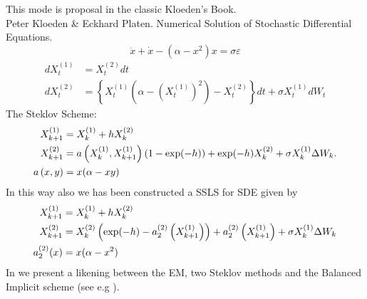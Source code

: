 This mode is proposal in the classic Kloeden's Book. \\ 
Peter Kloeden \& Eckhard Platen. Numerical Solution of Stochastic Differential Equations.
$$
	\ddot{x}+\dot{x}-(\alpha-x^2)x=\sigma \varepsilon
$$
\begin{align}
	dX_t^{(1)}&= X_t^{(2)} dt \label{eqn:SimDuffingVanDerPolSDE1}\\
	dX_t^{(2)}&=
		\left\{
		X_t^{(1)}
		\left(
			\alpha-(X_t^{(1)})^2
		\right)
		-X_t^{(2)}
	\right\}dt
	+\sigma X_t^{(1)} dW_t \label{eqn:SimDuffingVanDerPolSDE2}
\end{align}
The Steklov Scheme:
\begin{align}
	X^{(1)}_{k+1} &= X^{(1)}_{k} + h X^{(2)}_{k} \notag \\
	X^{(2)}_{k+1} & = a\left(X^{(1)}_{k},X^{(1)}_{k+1}\right)
		\left(
			1 - \exp(-h)
		\right)
		+ \exp(-h) X^{(2)}_{k} + \sigma X^{(1)}_{k} \Delta W_k. \label{eqn:SteklovSimDuffingVanDerPol}\\
		a\left(x, y\right) & = x (\alpha - xy) \notag
\end{align}
In this way also we has been constructed a SSLS for SDE 
 given by
\begin{align}
	X_{k+1}^{(1)} & = X_{k}^{(1)} + h X_{k}^{(2)} \notag\\
	X_{k+1}^{(2)} & = X_{k}^{(2)} 
		\left(
			\exp(-h) - a_2^{(2)}\left(X_{k+1}^{(1)}\right)
		\right) + a_2^{(2)}\left(X_{k+1}^{(1)}\right) 
		+ \sigma X_{k}^{(1)} \Delta W_k
		\label{eqn:SimDuffingVanDerPolSSLS2}\\
		a_2^{(2)}(x) & = x (\alpha - x^2) \notag
\end{align}
In  we present a likening between the EM, two Steklov methods and the Balanced
Implicit scheme (see e.g \cite{Alcock2006}).
